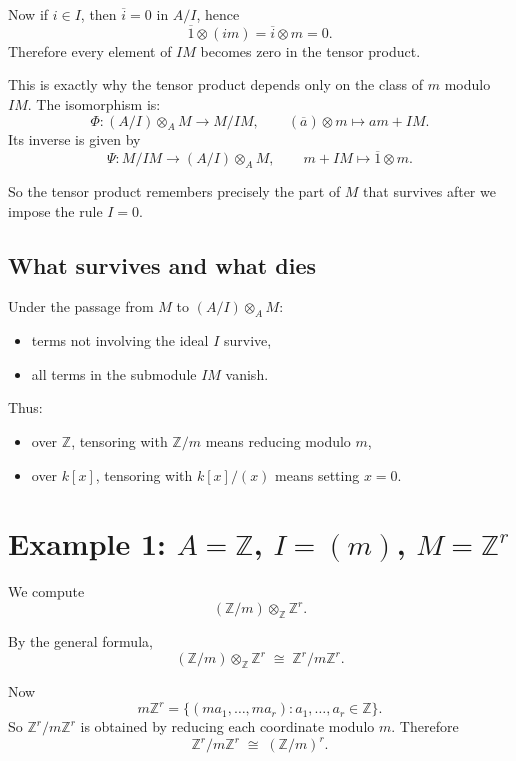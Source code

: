 \documentclass[12pt,a4paper]{article}
\theoremstyle{plain}
\theoremstyle{definition}      %
\begin{document}
	Now if \(i\in I\), then \(\overline{i}=0\) in \(A/I\), hence
	\[
	\overline{1}\otimes (im)
	=
	\overline{i}\otimes m
	=
	0.
	\]
	Therefore every element of \(IM\) becomes zero in the tensor product.
	
	This is exactly why the tensor product depends only on the class of \(m\) modulo \(IM\). The isomorphism is:
	\[
	\Phi:(A/I)\otimes_A M \longrightarrow M/IM,
	\qquad
	(\overline{a})\otimes m \longmapsto am+IM.
	\]
	Its inverse is given by
	\[
	\Psi:M/IM \longrightarrow (A/I)\otimes_A M,
	\qquad
	m+IM \longmapsto \overline{1}\otimes m.
	\]
	
	So the tensor product remembers precisely the part of \(M\) that survives after we impose the rule \(I=0\).
	
	\subsection{What survives and what dies}
	
	Under the passage from \(M\) to \((A/I)\otimes_A M\):
	\begin{itemize}
		\item terms not involving the ideal \(I\) survive,
		\item all terms in the submodule \(IM\) vanish.
	\end{itemize}
	
	Thus:
	\begin{itemize}
		\item over \(\mathbb Z\), tensoring with \(\mathbb Z/m\) means reducing modulo \(m\),
		\item over \(k[x]\), tensoring with \(k[x]/(x)\) means setting \(x=0\).
	\end{itemize}
	
	\section{Example 1: \texorpdfstring{$A=\mathbb Z$, $I=(m)$, $M=\mathbb Z^r$}{A=Z, I=(m), M=Z\^r}}
	
	We compute
	\[
	(\mathbb Z/m)\otimes_{\mathbb Z}\mathbb Z^r.
	\]
	
	By the general formula,
	\[
	(\mathbb Z/m)\otimes_{\mathbb Z}\mathbb Z^r
	\;\cong\;
	\mathbb Z^r / m\mathbb Z^r.
	\]
	
	Now
	\[
	m\mathbb Z^r
	=
	\{(ma_1,\dots,ma_r): a_1,\dots,a_r\in\mathbb Z\}.
	\]
	So \(\mathbb Z^r/m\mathbb Z^r\) is obtained by reducing each coordinate modulo \(m\). Therefore
	\[
	\mathbb Z^r/m\mathbb Z^r \;\cong\; (\mathbb Z/m)^r.
	\]
	
\end{document}
